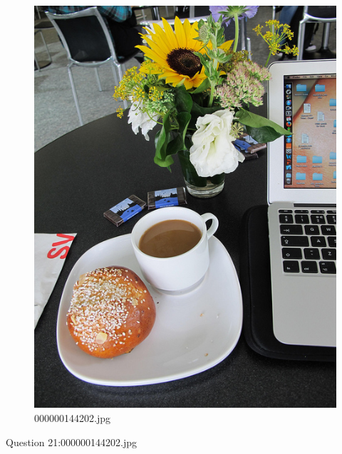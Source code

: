     \begin{figure}[h]
        \centering
        \includegraphics[width=0.8\linewidth]{../image set/easy/000000144202.jpg}
        \caption{000000144202.jpg}
    \end{figure}
    Question 21:000000144202.jpg
